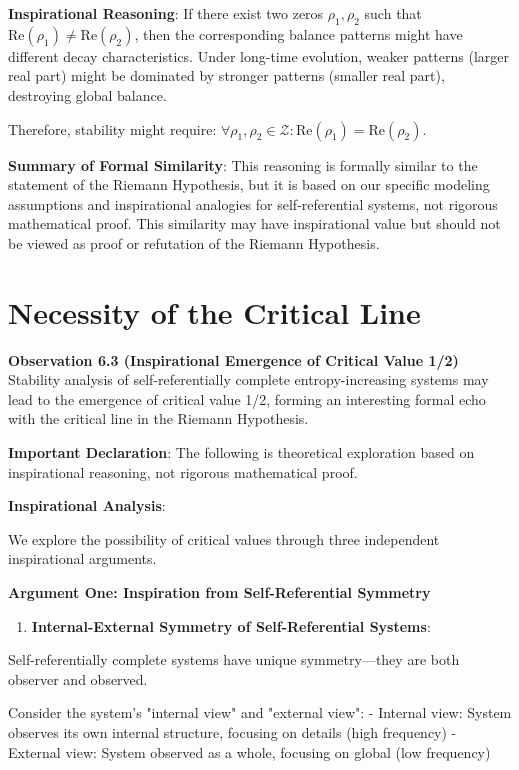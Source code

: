    \textbf{Inspirational Reasoning}: If there exist two zeros $\rho_1, \rho_2$ such that $\text{Re}(\rho_1) \neq \text{Re}(\rho_2)$,
   then the corresponding balance patterns might have different decay characteristics. Under long-time evolution,
   weaker patterns (larger real part) might be dominated by stronger patterns (smaller real part),
   destroying global balance.
   
   Therefore, stability might require: $\forall \rho_1, \rho_2 \in \mathcal{Z}: \text{Re}(\rho_1) = \text{Re}(\rho_2)$.

\textbf{Summary of Formal Similarity}: This reasoning is formally similar to the statement of the Riemann Hypothesis, but it is based on our specific modeling assumptions and inspirational analogies for self-referential systems, not rigorous mathematical proof. This similarity may have inspirational value but should not be viewed as proof or refutation of the Riemann Hypothesis.

\section{Necessity of the Critical Line}
\label{sec:ch06_riemann:necessity-of-the-critical-line}

\textbf{Observation 6.3 (Inspirational Emergence of Critical Value 1/2)}
\label{thm:4.5}
Stability analysis of self-referentially complete entropy-increasing systems may lead to the emergence of critical value 1/2, forming an interesting formal echo with the critical line in the Riemann Hypothesis.

\textbf{Important Declaration}: The following is theoretical exploration based on inspirational reasoning, not rigorous mathematical proof.

\textbf{Inspirational Analysis}:

We explore the possibility of critical values through three independent inspirational arguments.

\textbf{Argument One: Inspiration from Self-Referential Symmetry}

\begin{enumerate}
\item \textbf{Internal-External Symmetry of Self-Referential Systems}:
\end{enumerate}
   Self-referentially complete systems have unique symmetry---they are both observer and observed.
   
   Consider the system's "internal view" and "external view":
   - Internal view: System observes its own internal structure, focusing on details (high frequency)
   - External view: System observed as a whole, focusing on global (low frequency)
   
